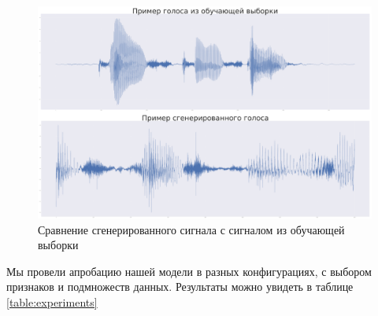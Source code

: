 \documentclass[../diploma.tex]{subfiles}
\begin{document}
\begin{figure}[h!]
  \centering
  \includegraphics[scale=0.4]{img/compare}
  \caption{Сравнение сгенерированного сигнала с сигналом из обучающей выборки}
  \label{fig:perf}
\end{figure} 

Мы провели апробацию нашей модели в разных конфигурациях, с выбором признаков и подмножеств данных. Результаты можно увидеть в таблице \ref{table:experiments}
\end{document}
